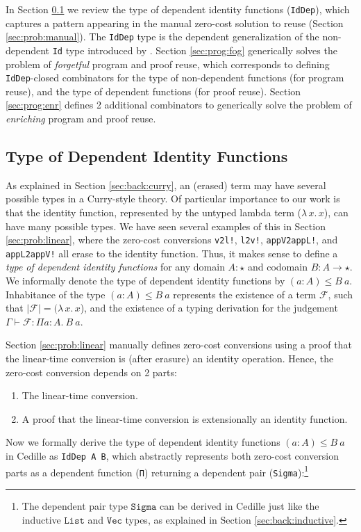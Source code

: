 \documentclass[acmsmall]{acmart}\settopmatter{}
\newcommand{\refsec}[1]{Section \ref{sec:#1}}
\newcommand{\labsec}[1]{\label{sec:#1}}
\newcommand{\lam}[2]{\lambda\, #1.\, #2}
\newcommand{\txt}[1]{\ensuremath{\texttt{#1}}}
\begin{document}
In \refsec{prog:id} we review the type of dependent identity
functions (\verb;IdDep;), which captures a pattern appearing in the
manual zero-cost solution to reuse (\refsec{prob:manual}).
The \verb;IdDep; type is the dependent generalization of the
non-dependent \verb;Id; type introduced by \citet{firsov18b}.
\refsec{prog:fog} generically solves the
problem of \textit{forgetful} program and proof reuse, which corresponds to
defining \verb;IdDep;-closed combinators for
the type of non-dependent functions (for program reuse), and
the type of dependent functions (for proof reuse).
\refsec{prog:enr} defines 2 additional combinators to generically solve the
problem of \textit{enriching} program and proof reuse.

\subsection{Type of Dependent Identity Functions}
\labsec{prog:id}

As explained in \refsec{back:curry}, an (erased) term may have several
possible types in a Curry-style theory. Of particular importance to
our work is that the identity function, represented by the untyped
lambda term ($\lam{x}{x}$), can have many possible types. We have seen
several examples of this in \refsec{prob:linear}, where the zero-cost
conversions \verb;v2l!;, \verb;l2v!;, \verb;appV2appL!;, and
\verb;appL2appV!; all erase to the identity function. Thus, it makes
sense to define a \textit{type of dependent identity functions} for any domain
$A : \star$ and codomain $B : A \rightarrow \star$.
We informally denote the
type of dependent identity functions by $(a : A) \leq B~a$.
Inhabitance of the type $(a : A) \leq B~a$ represents
the existence of a term $\mathcal{F}$, such that
$|\mathcal{F}|=(\lam{x}{x}$), and the existence of a typing derivation
for the judgement $\Gamma\vdash \mathcal{F} : \Pi a : A.~B~a$.

\refsec{prob:linear} manually defines zero-cost conversions
using a proof that the linear-time conversion is (after erasure)
an identity operation. Hence, the zero-cost conversion depends on 2 parts:
\begin{enumerate}
\item The linear-time conversion.
\item A proof that the linear-time conversion is extensionally an
  identity function. 
\end{enumerate}

Now we formally derive the type of dependent identity functions $(a :
A) \leq B~a$ in Cedille as \verb;IdDep A B;,
which abstractly represents both zero-cost conversion
parts as a dependent function (\verb;Π;) returning a dependent pair
(\verb;Sigma;):\footnote{
  The dependent pair type \txt{Sigma} can be derived in Cedille just
  like the inductive \txt{List} and \txt{Vec} types, as explained in
  \refsec{back:inductive}.
  }
\end{document}
